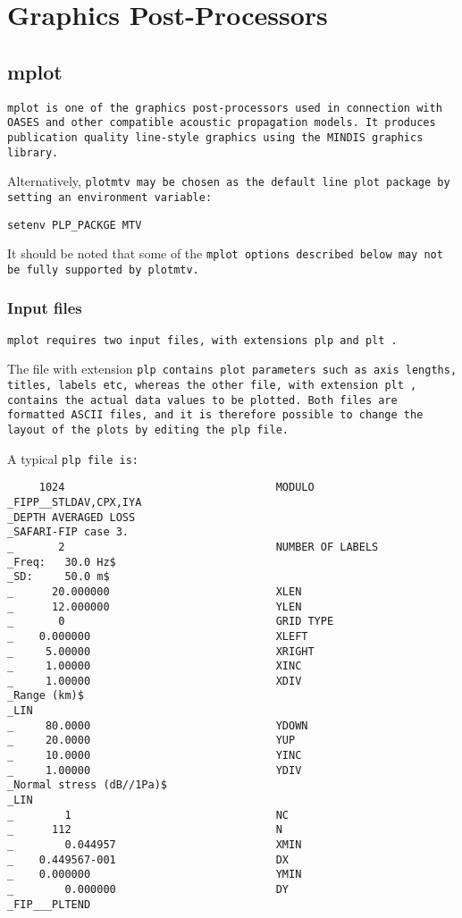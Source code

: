 \section{Graphics Post-Processors}

\subsection{mplot}

\label{sec:mplot}

\tt mplot \rm is one of the graphics post-processors used in
connection with OASES and other compatible  acoustic propagation
models. 
It produces
publication quality line-style graphics using the \tt MINDIS \rm
graphics library.

Alternatively, \tt plotmtv \rm may be chosen as the default line plot
package by setting an environment variable:

\begin{verbatim}
setenv PLP_PACKGE MTV
\end{verbatim}

It should be noted that some of the \tt mplot \rm options described
below may not be fully supported by \tt plotmtv. \rm


\subsubsection{Input files}

\tt mplot \rm requires two input files, with extensions \tt plp \rm
and \tt plt \rm.

The file with extension \tt plp \rm contains plot parameters such as axis 
lengths, titles, labels etc, whereas the other file, with extension
\tt plt \rm, 
contains the actual data values to be plotted. Both files are formatted ASCII
files, and it is therefore possible to change the layout of the plots by
editing the \tt plp \rm file. 

A typical \tt plp \rm file is:

\small
\begin{verbatim}
     1024                                 MODULO
_FIPP__STLDAV,CPX,IYA	
_DEPTH AVERAGED LOSS	
_SAFARI-FIP case 3.	
_       2                                 NUMBER OF LABELS 
_Freq:   30.0 Hz$
_SD:     50.0 m$
_      20.000000                          XLEN	
_      12.000000                          YLEN	
_       0                                 GRID TYPE	
_    0.000000                             XLEFT	
_     5.00000                             XRIGHT	
_     1.00000                             XINC	
_     1.00000                             XDIV	
_Range (km)$	
_LIN		
_     80.0000                             YDOWN	
_     20.0000                             YUP
_     10.0000                             YINC
_     1.00000                             YDIV
_Normal stress (dB//1Pa)$
_LIN				
_        1                                NC
_      112                                N	
_        0.044957                         XMIN	
_    0.449567-001                         DX	
_    0.000000                             YMIN
_        0.000000                         DY
_FIP___PLTEND			
\end{verbatim}
\normalsize


